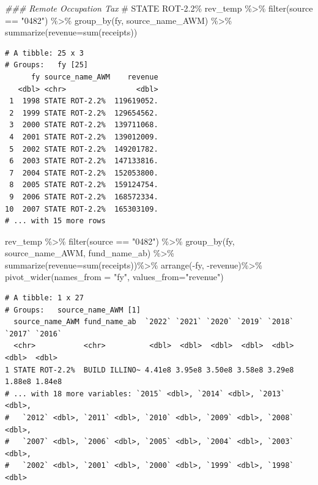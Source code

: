 \documentclass[
  letterpaper,
  DIV=11,
  numbers=noendperiod]{scrreport}
\newenvironment{Shaded}{\begin{snugshade}}{\end{snugshade}}
\newcommand{\AttributeTok}[1]{\textcolor[rgb]{0.40,0.45,0.13}{#1}}
\newcommand{\CommentTok}[1]{\textcolor[rgb]{0.37,0.37,0.37}{#1}}
\newcommand{\DocumentationTok}[1]{\textcolor[rgb]{0.37,0.37,0.37}{\textit{#1}}}
\newcommand{\FunctionTok}[1]{\textcolor[rgb]{0.28,0.35,0.67}{#1}}
\newcommand{\NormalTok}[1]{\textcolor[rgb]{0.00,0.23,0.31}{#1}}
\newcommand{\SpecialCharTok}[1]{\textcolor[rgb]{0.37,0.37,0.37}{#1}}
\newcommand{\StringTok}[1]{\textcolor[rgb]{0.13,0.47,0.30}{#1}}
\begin{document}
\begin{Shaded}
\begin{Highlighting}[]
\DocumentationTok{\#\#\# Remote Occupation Tax}
\CommentTok{\# STATE ROT{-}2.2\%}
\NormalTok{rev\_temp }\SpecialCharTok{\%\textgreater{}\%} 
  \FunctionTok{filter}\NormalTok{(source }\SpecialCharTok{==} \StringTok{"0482"}\NormalTok{) }\SpecialCharTok{\%\textgreater{}\%}
  \FunctionTok{group\_by}\NormalTok{(fy, source\_name\_AWM) }\SpecialCharTok{\%\textgreater{}\%} 
  \FunctionTok{summarize}\NormalTok{(}\AttributeTok{revenue=}\FunctionTok{sum}\NormalTok{(receipts))}
\end{Highlighting}
\end{Shaded}

\begin{verbatim}
# A tibble: 25 x 3
# Groups:   fy [25]
      fy source_name_AWM    revenue
   <dbl> <chr>                <dbl>
 1  1998 STATE ROT-2.2%  119619052.
 2  1999 STATE ROT-2.2%  129654562.
 3  2000 STATE ROT-2.2%  139711068.
 4  2001 STATE ROT-2.2%  139012009.
 5  2002 STATE ROT-2.2%  149201782.
 6  2003 STATE ROT-2.2%  147133816.
 7  2004 STATE ROT-2.2%  152053800.
 8  2005 STATE ROT-2.2%  159124754.
 9  2006 STATE ROT-2.2%  168572334.
10  2007 STATE ROT-2.2%  165303109.
# ... with 15 more rows
\end{verbatim}

\begin{Shaded}
\begin{Highlighting}[]
\NormalTok{rev\_temp }\SpecialCharTok{\%\textgreater{}\%} 
  \FunctionTok{filter}\NormalTok{(source }\SpecialCharTok{==} \StringTok{"0482"}\NormalTok{) }\SpecialCharTok{\%\textgreater{}\%}
  \FunctionTok{group\_by}\NormalTok{(fy, source\_name\_AWM, fund\_name\_ab) }\SpecialCharTok{\%\textgreater{}\%} 
  \FunctionTok{summarize}\NormalTok{(}\AttributeTok{revenue=}\FunctionTok{sum}\NormalTok{(receipts))}\SpecialCharTok{\%\textgreater{}\%}
  \FunctionTok{arrange}\NormalTok{(}\SpecialCharTok{{-}}\NormalTok{fy, }\SpecialCharTok{{-}}\NormalTok{revenue)}\SpecialCharTok{\%\textgreater{}\%}
  \FunctionTok{pivot\_wider}\NormalTok{(}\AttributeTok{names\_from =} \StringTok{"fy"}\NormalTok{, }\AttributeTok{values\_from=}\StringTok{"revenue"}\NormalTok{)}
\end{Highlighting}
\end{Shaded}

\begin{verbatim}
# A tibble: 1 x 27
# Groups:   source_name_AWM [1]
  source_name_AWM fund_name_ab  `2022` `2021` `2020` `2019` `2018` `2017` `2016`
  <chr>           <chr>          <dbl>  <dbl>  <dbl>  <dbl>  <dbl>  <dbl>  <dbl>
1 STATE ROT-2.2%  BUILD ILLINO~ 4.41e8 3.95e8 3.50e8 3.58e8 3.29e8 1.88e8 1.84e8
# ... with 18 more variables: `2015` <dbl>, `2014` <dbl>, `2013` <dbl>,
#   `2012` <dbl>, `2011` <dbl>, `2010` <dbl>, `2009` <dbl>, `2008` <dbl>,
#   `2007` <dbl>, `2006` <dbl>, `2005` <dbl>, `2004` <dbl>, `2003` <dbl>,
#   `2002` <dbl>, `2001` <dbl>, `2000` <dbl>, `1999` <dbl>, `1998` <dbl>
\end{verbatim}
\end{document}
